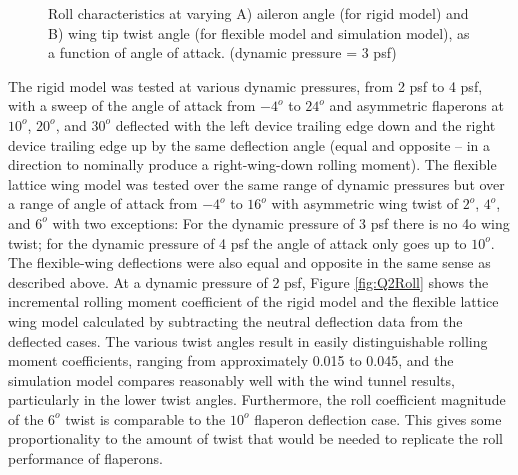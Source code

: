 \documentclass[11pt]{ucthesis}
\begin{document}
\begin{figure}[thpb]
\hfill
{}
\hfill
{}
\hfill
\caption{Roll characteristics at varying A) aileron angle (for rigid model) and B) wing tip twist angle (for flexible model and simulation model), as a function of angle of attack. (dynamic pressure = 3 psf)}
\label{fig:Q3Roll}
\end{figure}

The rigid model was tested at various dynamic pressures, from 2 psf to 4 psf, with a sweep of the angle of attack from $−4^o$ to $24^o$ and asymmetric flaperons at $10^o$, $20^o$, and $30^o$ deflected with the left device trailing edge down and the right device trailing edge up by the same deflection angle (equal and opposite – in a direction to nominally produce a right-wing-down rolling moment).  The flexible lattice wing model was tested over the same range of dynamic pressures but over a range of angle of attack from $−4^o$ to $16^o$ with asymmetric wing twist of $2^o$, $4^o$, and $6^o$ with two exceptions:  For the dynamic pressure of 3 psf there is no 4o wing twist; for the dynamic pressure of 4 psf the angle of attack only goes up to $10^o$.  The flexible-wing deflections were also equal and opposite in the same sense as described above.  At a dynamic pressure of 2 psf, Figure \ref{fig:Q2Roll} shows the incremental rolling moment coefficient of the rigid model and the flexible lattice wing model calculated by subtracting the neutral deflection data from the deflected cases. The various twist angles result in easily distinguishable rolling moment coefficients, ranging from approximately 0.015 to 0.045, and the simulation model compares reasonably well with the wind tunnel results, particularly in the lower twist angles. Furthermore, the roll coefficient magnitude of the $6^o$ twist is comparable to the $10^o$ flaperon deflection case. This gives some proportionality to the amount of twist that would be needed to replicate the roll performance of flaperons.
\end{document}
